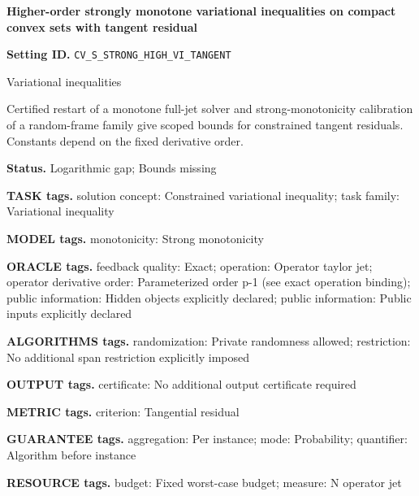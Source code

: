 \documentclass[10pt,a4paper]{article}
\begin{document}
\raggedright

{\LARGE\bfseries\sffamily\color{AtlasNavy} Higher-order strongly monotone variational inequalities on compact convex sets with tangent residual\par}\vspace{5pt}


\textbf{Setting ID.} \texttt{CV\_\allowbreak{}S\_\allowbreak{}STRONG\_\allowbreak{}HIGH\_\allowbreak{}VI\_\allowbreak{}TANGENT}



Variational inequalities



Certified restart of a monotone full-jet solver and strong-monotonicity calibration of a random-frame family give scoped bounds for constrained tangent residuals. Constants depend on the fixed derivative order.



\textbf{Status.} Logarithmic gap; Bounds missing



\textbf{TASK tags.} solution concept: Constrained variational inequality; task family: Variational inequality



\textbf{MODEL tags.} monotonicity: Strong monotonicity



\textbf{ORACLE tags.} feedback quality: Exact; operation: Operator taylor jet; operator derivative order: Parameterized order p-1 (see exact operation binding); public information: Hidden objects explicitly declared; public information: Public inputs explicitly declared



\textbf{ALGORITHMS tags.} randomization: Private randomness allowed; restriction: No additional span restriction explicitly imposed



\textbf{OUTPUT tags.} certificate: No additional output certificate required



\textbf{METRIC tags.} criterion: Tangential residual



\textbf{GUARANTEE tags.} aggregation: Per instance; mode: Probability; quantifier: Algorithm before instance



\textbf{RESOURCE tags.} budget: Fixed worst-case budget; measure: N operator jet
\end{document}
